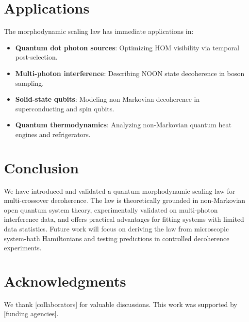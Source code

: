 \documentclass[12pt,a4paper]{article}
\begin{document}
\section{Applications}

The morphodynamic scaling law has immediate applications in:
\begin{itemize}
\item \textbf{Quantum dot photon sources}: Optimizing HOM visibility via temporal post-selection.
\item \textbf{Multi-photon interference}: Describing NOON state decoherence in boson sampling.
\item \textbf{Solid-state qubits}: Modeling non-Markovian decoherence in superconducting and spin qubits.
\item \textbf{Quantum thermodynamics}: Analyzing non-Markovian quantum heat engines and refrigerators.
\end{itemize}

\section{Conclusion}

We have introduced and validated a quantum morphodynamic scaling law for multi-crossover decoherence. The law is theoretically grounded in non-Markovian open quantum system theory, experimentally validated on multi-photon interference data, and offers practical advantages for fitting systems with limited data statistics. Future work will focus on deriving the law from microscopic system-bath Hamiltonians and testing predictions in controlled decoherence experiments.

\section*{Acknowledgments}

We thank [collaborators] for valuable discussions. This work was supported by [funding agencies].
\end{document}
